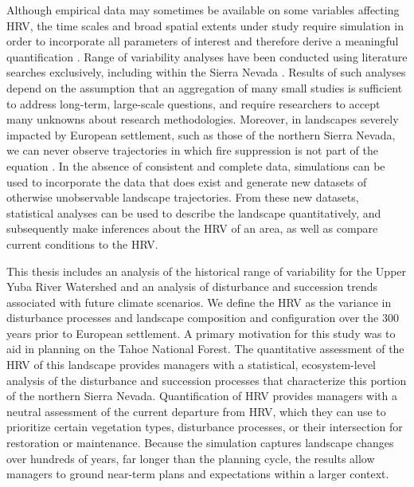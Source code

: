 Although empirical data may sometimes be available on some variables affecting HRV, the time scales and broad spatial extents under study require simulation in order to incorporate all parameters of interest and therefore derive a meaningful quantification  \citep{Swetnam1999,Mladenoff1999}. Range of variability analyses have been conducted using literature searches exclusively, including within the Sierra Nevada \citep{Safford2013}. Results of such analyses depend on the assumption that an aggregation of many small studies is sufficient to address long-term, large-scale questions, and require researchers to accept many unknowns about research methodologies. Moreover, in landscapes severely impacted by European settlement, such as those of the northern Sierra Nevada, we can never observe trajectories in which fire suppression is not part of the equation \citep{Keane2012}. In the absence of consistent and complete data, simulations can be used to incorporate the data that does exist and generate new datasets of otherwise unobservable landscape trajectories. From these new datasets, statistical analyses can be used to describe the landscape quantitatively, and subsequently make inferences about the HRV of an area, as well as compare current conditions to the HRV.

This thesis includes an analysis of the historical range of variability for the Upper Yuba River Watershed and an analysis of disturbance and succession trends associated with future climate scenarios. We define the HRV as the variance in disturbance processes and landscape composition and configuration over the 300 years prior to European settlement. A primary motivation for this study was to aid in planning on the Tahoe National Forest. The quantitative assessment of the HRV of this landscape provides managers with a statistical, ecosystem-level analysis of the disturbance and succession processes that characterize this portion of the northern Sierra Nevada. Quantification of HRV provides managers with a neutral assessment of the current departure from HRV, which they can use to prioritize certain vegetation types, disturbance processes, or their intersection for restoration or maintenance. Because the simulation captures landscape changes over hundreds of years, far longer than the planning cycle, the results allow managers to ground near-term plans and expectations within a larger context. 

